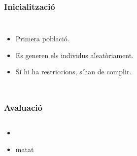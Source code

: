 \documentclass{beamer}
\begin{document}
\begin{frame}
	\frametitle{Inicialització}
	\begin{columns}[c]
		\begin{itemize}
			\item Primera població.
			\item Es generen els individus aleatòriament.
			\item Si hi ha restriccions, s'han de complir.
		\end{itemize}
	\end{columns}
\end{frame}

\begin{frame}
	\frametitle{Avaluació}
	\begin{columns}[c]
		\begin{itemize}
			\item 
				\pause
			\item matat
		\end{itemize}
	\end{columns}
\end{frame}
\end{document}
